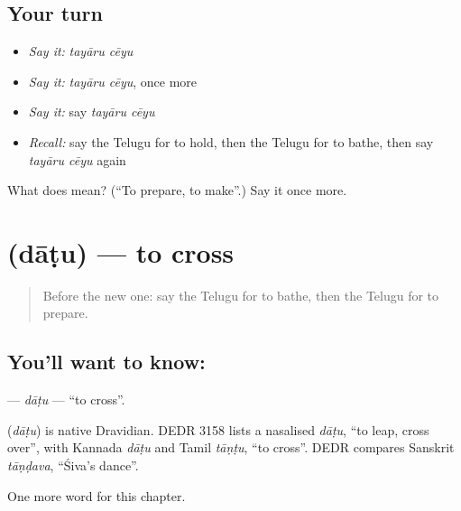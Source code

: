 \subsection*{Your turn}
\begin{itemize}
\raggedright
  \item \emph{Say it:} \emph{tayāru cēyu}
  \item \emph{Say it:} \emph{tayāru cēyu}, once more
  \item \emph{Say it:} say \emph{tayāru cēyu}
  \item \emph{Recall:} say the Telugu for to hold, then the Telugu for to bathe, then say \emph{tayāru cēyu} again
\end{itemize}

\begin{tcolorbox}[breakable,colback=teal!4,colframe=teal!35!black,title={Before you move on}]
What does   mean? (\textquotedblleft{}To prepare, to make\textquotedblright{}.) Say it once more.
\end{tcolorbox}
\section[\texorpdfstring{\te{దాటు} (dāṭu)}{దాటు (dāṭu)}]{ (dāṭu) — to cross}

\label{lesson:TE-C278-datu}



\begin{quote}
Before the new one: say the Telugu for to bathe, then the Telugu for to prepare.
\end{quote}

\subsection*{You'll want to know: }
\textbf{} — \emph{dāṭu} — \textquotedblleft{}to cross\textquotedblright{}.

\begin{cousinweb}
\textbf{} (\emph{dāṭu}) is native Dravidian. DEDR 3158 lists a nasalised \emph{dāṭu}, \textquotedblleft{}to leap, cross over\textquotedblright{}, with Kannada \emph{dāṭu} and Tamil \emph{tāṇṭu}, \textquotedblleft{}to cross\textquotedblright{}. DEDR compares Sanskrit \emph{tāṇḍava}, \textquotedblleft{}Śiva's dance\textquotedblright{}.
\end{cousinweb}

\begin{grammarlens}[title={What you've built}]
One more word for this chapter.
\end{grammarlens}

